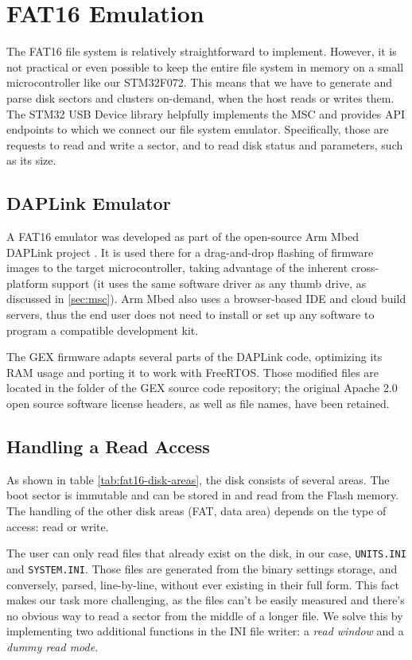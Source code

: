 \section{FAT16 Emulation}

The FAT16 file system is relatively straightforward to implement. However, it is not practical or even possible to keep the entire file system in memory on a small microcontroller like our STM32F072. This means that we have to generate and parse disk sectors and clusters on-demand, when the host reads or writes them. The STM32 \gls{USB} Device library helpfully implements the \gls{MSC} and provides \gls{API} endpoints to which we connect our file system emulator. Specifically, those are requests to read and write a sector, and to read disk status and parameters, such as its size.

\subsection{DAPLink Emulator}

A FAT16 emulator was developed as part of the open-source Arm Mbed DAPLink project \cite{daplink}. It is used there for a drag-and-drop flashing of firmware images to the target microcontroller, taking advantage of the inherent cross-platform support (it uses the same software driver as any thumb drive, as discussed in \ref{sec:msc}). Arm Mbed also uses a browser-based \gls{IDE} and cloud build servers, thus the end user does not need to install or set up any software to program a compatible development kit.

The GEX firmware adapts several parts of the DAPLink code, optimizing its \gls{RAM} usage and porting it to work with FreeRTOS. Those modified files are located in the folder  of the GEX source code repository; the original Apache 2.0 open source software license headers, as well as file names, have been retained.

\subsection{Handling a Read Access}

As shown in table \ref{tab:fat16-disk-areas}, the disk consists of several areas. The boot sector is immutable and can be stored in and read from the Flash memory. The handling of the other disk areas (\gls{FAT}, data area) depends on the type of access: read or write.

The user can only read files that already exist on the disk, in our case, \verb|UNITS.INI| and \verb|SYSTEM.INI|. Those files are generated from the binary settings storage, and conversely, parsed, line-by-line, without ever existing in their full form. This fact makes our task more challenging, as the files can't be easily measured and there's no obvious way to read a sector from the middle of a longer file. We solve this by implementing two additional functions in the INI file writer: a \textit{read window} and a \textit{dummy read mode}.

